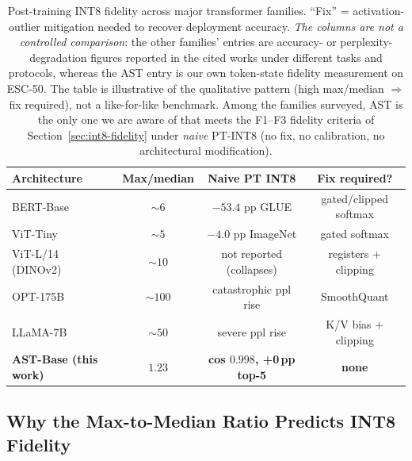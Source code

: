 \documentclass[conference]{IEEEtran}
\begin{document}
\begin{table}[t]
\caption{Post-training INT8 fidelity across major transformer families. ``Fix'' = activation-outlier mitigation needed to recover deployment accuracy. \emph{The columns are not a controlled comparison}: the other families' entries are accuracy- or perplexity-degradation figures reported in the cited works under different tasks and protocols, whereas the AST entry is our own token-state fidelity measurement on ESC-50. The table is illustrative of the qualitative pattern (high max/median $\Rightarrow$ fix required), not a like-for-like benchmark. Among the families surveyed, AST is the only one we are aware of that meets the F1--F3 fidelity criteria of Section~\ref{sec:int8-fidelity} under \emph{naive} PT-INT8 (no fix, no calibration, no architectural modification).}
\label{tab:int8-compare}
\centering
\setlength{\tabcolsep}{3.2pt}
\renewcommand{\arraystretch}{1.13}
\begin{tabular}{l c c c}
\toprule
\textbf{Architecture} & \textbf{Max/median} & \textbf{Naive PT INT8} & \textbf{Fix required?} \\
\midrule
BERT-Base \cite{bondarenko2023quantizable}      & $\sim 6$  & $-53.4$ pp GLUE        & gated/clipped softmax \\
ViT-Tiny  \cite{bondarenko2023quantizable}      & $\sim 5$  & $-4.0$ pp ImageNet     & gated softmax \\
ViT-L/14 (DINOv2) \cite{darcet2024need,sun2024massive} & $\sim 10$ & not reported (collapses) & registers + clipping \\
OPT-175B  \cite{xiao2024streaming}              & $\sim 100$ & catastrophic ppl rise & SmoothQuant \\
LLaMA-7B  \cite{sun2024massive}                 & $\sim 50$ & severe ppl rise        & K/V bias + clipping \\
\textbf{AST-Base (this work)}                    & $\mathbf{1.23}$ & \textbf{cos $0.998$, +0\,pp top-5} & \textbf{none} \\
\bottomrule
\end{tabular}
\end{table}

\subsection{Why the Max-to-Median Ratio Predicts INT8 Fidelity}
\label{sec:int8-mechanism}
\end{document}
